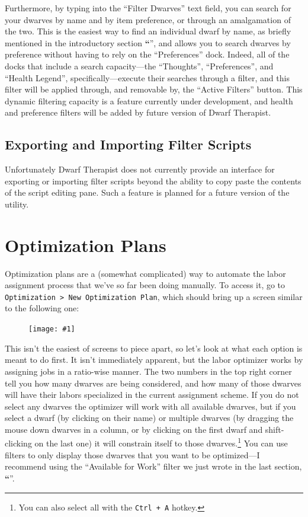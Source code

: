 \documentclass[]{article}
\newcommand{\jump}[1] {\textbf{``\nameref{sec:#1}}''}
\newcommand{\legacy}[1] {
\begin{center}
\colorbox{legacy-content}{
\begin{minipage}[t]{0.95\linewidth}
#1
\end{minipage}
}
\end{center}
}
\newcommand{\fullfigure}[1] {
\begin{figure}[h!]
\texttt{[image: \#1]}
\end{figure}
}
\begin{document}
Furthermore, by typing into the ``Filter Dwarves'' text field, you can search for your dwarves by name and by item preference, or through an amalgamation of the two. This is the easiest way to find an individual dwarf by name, as briefly mentioned in the introductory section \jump{Group By and Filters}, and allows you to search dwarves by preference without having to rely on the ``Preferences'' dock. Indeed, all of the docks that include a search capacity---the ``Thoughts'', ``Preferences'', and ``Health Legend'', specifically---execute their searches through a filter, and this filter will be applied through, and removable by, the ``Active Filters'' button. This dynamic filtering capacity is a feature currently under development, and health and preference filters will be added by future version of Dwarf Therapist.

\subsection{Exporting and Importing Filter Scripts}
\label{sec:Exporting and Importing Filter Scripts}

Unfortunately Dwarf Therapist does not currently provide an interface for exporting or importing filter
scripts beyond the ability to copy paste the contents of the script editing pane. Such a feature is
planned for a future version of the utility.

\newpage
\section{Optimization Plans}
\label{sec:Optimization Plans}


Optimization plans are a (somewhat complicated) way to automate the labor assignment process that we've
so far been doing manually. To access it, go to \texttt{Optimization > New Optimization Plan}, which
should bring up a screen similar to the following one:

\fullfigure{Sec4Fig5}

This isn't the easiest of screens to piece apart, so let's look at what each option is meant to do first.
It isn't immediately apparent, but the labor optimizer works by assigning jobs in a ratio-wise manner.
The two numbers in the top right corner tell you how many dwarves are being considered, and how many of
those dwarves will have their labors specialized in the current assignment scheme. If you do not select
any dwarves the optimizer will work with all available dwarves, but if you select a dwarf (by clicking on
their name) or multiple dwarves (by dragging the mouse down dwarves in a column, or by clicking on
the first dwarf and shift-clicking on the last one) it will constrain itself to those
dwarves.\footnote{You can also select all with the \texttt{Ctrl + A} hotkey.} You can use filters to
only display those dwarves that you want to be optimized---I recommend using the ``Available for Work''
filter we just wrote in the last section, \jump{Writing Complex Scripts}.
\end{document}
